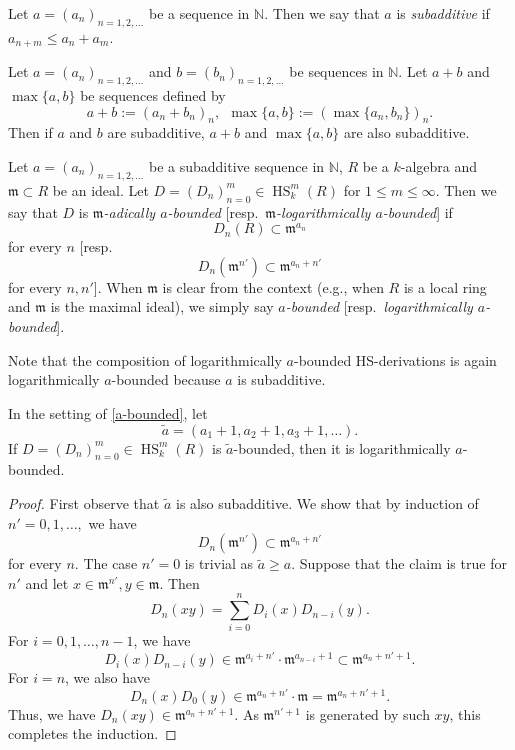 \documentclass{amsart}
\newcommand{\HS}{\operatorname{HS}}
\begin{document}
\begin{definition}
    Let $a=(a_n)_{n=1,2,\dots}$ be a sequence in $\mathbb{N}$. Then we say that $a$ is {\em subadditive} if $a_{n+m}\le a_n+a_m$.
\end{definition}

\begin{lemma}
    Let $a=(a_n)_{n=1,2,\dots}$ and $b=(b_n)_{n=1,2,\dots}$ be sequences in $\mathbb{N}$. Let $a+b$ and $\max\{a,b\}$ be sequences defined by
    $$a+b:=(a_n+b_n)_n,\ \ \max\{a,b\}:=(\max\{a_n,b_n\})_n.$$
    Then if $a$ and $b$ are subadditive, $a+b$ and $\max\{a,b\}$ are also subadditive.
\end{lemma}

\begin{definition}\label{a-bounded}
    Let $a=(a_n)_{n=1,2,\dots}$ be a subadditive sequence in $\mathbb{N}$, $R$ be a $k$-algebra and $\mathfrak{m}\subset R$ be an ideal. Let $D=(D_n)_{n=0}^m \in \HS_k ^m (R)$ for $1\le m\le\infty$. Then we say that $D$ is {\em $\mathfrak{m}$-adically $a$-bounded} [resp.\ {\em $\mathfrak{m}$-logarithmically $a$-bounded}] if
    $$D_n(R)\subset \mathfrak{m}^{a_n}$$
    for every $n$ [resp.\
    $$D_n(\mathfrak{m}^{n'})\subset \mathfrak{m}^{a_n+n'}$$
    for every $n,n'$]. When $\mathfrak{m}$ is clear from the context (e.g., when $R$ is a local ring and $\mathfrak{m}$ is the maximal ideal), we simply say {\em $a$-bounded} [resp.\ {\em logarithmically $a$-bounded}].
\end{definition}

Note that the composition of logarithmically $a$-bounded HS-derivations is again logarithmically $a$-bounded because $a$ is subadditive.

\begin{lemma}\label{a to log lem}
    In the setting of \ref{a-bounded}, let
    $$\widetilde{a}=(a_1+1,a_2+1,a_3+1,\dots).$$
    If $D=(D_n)_{n=0}^m \in \HS_k ^m (R)$ is $\widetilde{a}$-bounded, then it is logarithmically $a$-bounded.
\end{lemma}

\begin{proof}
    First observe that $\widetilde{a}$ is also subadditive. We show that by induction of $n'=0,1,\dots,$ we have
    $$D_n(\mathfrak{m}^{n'})\subset \mathfrak{m}^{a_n+n'}$$
    for every $n$. The case $n'=0$ is trivial as $\widetilde{a}\ge a$. Suppose that the claim is true for $n'$ and let $x\in \mathfrak{m}^{n'}, y\in \mathfrak{m}$. Then
    $$D_n(xy)=\sum_{i=0}^{n}D_{i}(x)D_{n-i}(y).$$
    For $i=0,1,\dots, n-1$, we have $$D_{i}(x)D_{n-i}(y)\in \mathfrak{m}^{a_{i}+n'}\cdot \mathfrak{m}^{a_{n-i}+1}\subset  \mathfrak{m}^{a_{n}+n'+1}.$$ For $i=n$, we also have $$D_n(x)D_{0}(y)\in \mathfrak{m}^{a_{n}+n'}\cdot \mathfrak{m}=\mathfrak{m}^{a_{n}+n'+1}.$$ Thus, we have $D_n(xy)\in \mathfrak{m}^{a_{n}+n'+1}$. As $\mathfrak{m}^{n'+1}$ is generated by such $xy$, this completes the induction.
    \end{proof}
\end{document}

